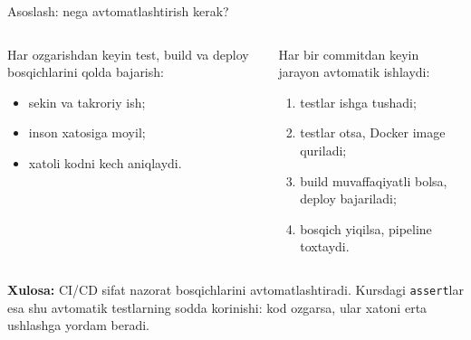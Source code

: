 \documentclass[aspectratio=169,11pt]{beamer}
\newcommand{\uzq}{\textquotesingle{}}   %
\begin{document}
\begin{frame}{Asoslash: nega avtomatlashtirish kerak?}
  \small

  \begin{columns}[T,totalwidth=\textwidth]
    \begin{column}{0.48\textwidth}
      \begin{tcolorbox}[warnbox,title={Qo\uzq{}lda bajarilsa},top=2pt,bottom=2pt]
        \footnotesize
        Har o\uzq{}zgarishdan keyin test, build va deploy bosqichlarini
        qo\uzq{}lda bajarish:
        \begin{itemize}\setlength\itemsep{2pt}
          \item sekin va takroriy ish;
          \item inson xatosiga moyil;
          \item xatoli kodni kech aniqlaydi.
        \end{itemize}
      \end{tcolorbox}
    \end{column}

    \begin{column}{0.49\textwidth}
      \begin{tcolorbox}[okbox,title={CI/CD pipeline bo\uzq{}lsa},top=2pt,bottom=2pt]
        \footnotesize
        Har bir commitdan keyin jarayon avtomatik ishlaydi:
        \begin{enumerate}\setlength\itemsep{2pt}
          \item testlar ishga tushadi;
          \item testlar o\uzq{}tsa, Docker image quriladi;
          \item build muvaffaqiyatli bo\uzq{}lsa, deploy bajariladi;
          \item bosqich yiqilsa, pipeline to\uzq{}xtaydi.
        \end{enumerate}
      \end{tcolorbox}
    \end{column}
  \end{columns}

  \vspace{4pt}

  \begin{tcolorbox}[defbox,top=2pt,bottom=2pt,left=4pt,right=4pt]
    \footnotesize
    \textbf{Xulosa:}
    CI/CD sifat nazorat bosqichlarini avtomatlashtiradi.
    Kursdagi \texttt{assert}lar esa shu avtomatik testlarning sodda ko\uzq{}rinishi:
    kod o\uzq{}zgarsa, ular xatoni erta ushlashga yordam beradi.
  \end{tcolorbox}
\end{frame}
\end{document}
